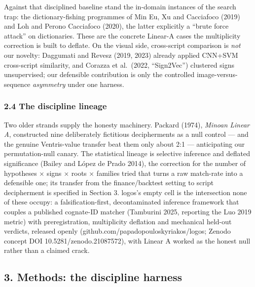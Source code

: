 \documentclass[
  10pt,
]{article}
\begin{document}
Against that disciplined baseline stand the in-domain instances of the
search trap: the dictionary-fishing programmes of Min Eu, Xu and
Cacciafoco (2019) and Loh and Perono Cacciafoco (2020), the latter
explicitly a ``brute force attack'' on dictionaries. These are the
concrete Linear-A cases the multiplicity correction is built to deflate.
On the visual side, cross-script comparison is \emph{not} our novelty:
Daggumati and Revesz (2019, 2023) already applied CNN+SVM cross-script
similarity, and Corazza et al.~(2022, ``Sign2Vec'') clustered signs
unsupervised; our defensible contribution is only the controlled
image-versus-sequence \emph{asymmetry} under one harness.

\hypertarget{the-discipline-lineage}{%
\subsubsection{2.4 The discipline
lineage}\label{the-discipline-lineage}}

Two older strands supply the honesty machinery. Packard (1974),
\emph{Minoan Linear A}, constructed nine deliberately fictitious
decipherments as a null control --- and the genuine Ventris-value
transfer beat them only about 2:1 --- anticipating our permutation-null
canary. The statistical lineage is selective inference and deflated
significance (Bailey and López de Prado 2014), the correction for the
number of hypotheses × signs × roots × families tried that turns a raw
match-rate into a defensible one; its transfer from the finance/backtest
setting to script decipherment is specified in Section 3. logos's empty
cell is the intersection none of these occupy: a falsification-first,
decontaminated inference framework that couples a published cognate-ID
matcher (Tamburini 2025, reporting the Luo 2019 metric) with
preregistration, multiplicity deflation and mechanical held-out
verdicts, released openly (github.com/papadopouloskyriakos/logos; Zenodo
concept DOI 10.5281/zenodo.21087572), with Linear A worked as the honest
null rather than a claimed crack.

\hypertarget{methods-the-discipline-harness}{%
\subsection{3. Methods: the discipline
harness}\label{methods-the-discipline-harness}}
\end{document}
